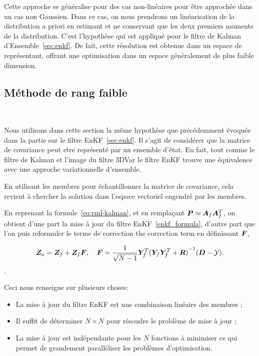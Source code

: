 Cette approche se généralise pour des cas non-linéaires pour être approchée dans un cas non Gaussien. Dans ce cas, on nous prendrons un linéarisation de la distribution a priori en estimant et ne conservant que les deux premiers moments de la distribution. C'est l'hypothèse qui est appliqué pour le filtre de Kalman d'Ensemble~\ref{sec:enkf}. De fait, cette résolution est obtenue dans un espace de représentant, offrant une optimisation dans un espace généralement de plus faible dimension.

\subsection{Méthode de rang faible}~\label{sec:faible_rang}

Nous utilisons dans cette section la même hypothèse que précédemment évoquée dans la partie sur le filtre EnKF~\ref{sec:enkf}. Il s'agit de considérer que la matrice de covariance peut etre représenté par un ensemble d'état. En fait, tout comme le filtre de Kalman et l'image du filtre 3DVar le filtre EnKF trouve une équivalence avec une approche variationnelle d'ensemble.

En utilisant les membres pour échantillonner la matrice de covariance, cela revient à chercher la solution dans l'espace vectoriel engendré par les membres.

En reprenant la formule~\ref{eq:rml-kalman}, et en remplaçant $\bm P \approx \bm A_f \bm A_f^T$, on obtient d'une part la mise à jour du filtre EnKF~\ref{enkf_formula}, d'autre part que l'on puis reformuler le terme de correction the correction term en définissant $\bm{F}$,

\begin{equation}
    \bm{Z}_a = \bm{Z}_f + \bm{Z}_f \bm{F}, \quad \bm{F} = \frac{1}{\sqrt{N-1}} \bm Y_f^T {(\bm Y_f \bm Y_f^T + \bm R)}^{-1}(\bm{D} - \mathcal{Y}).
\end{equation}.

Ceci nous renseigne sur plusieurs choses:
\begin{itemize}
    \item La mise à jour du filtre EnKF est une combinaison linéaire des membres ;
    \item Il suffit de déterminer $N \times N$ pour résoudre le problème de mise à jour ;
    \item La mise à jour est indépendante pour les $N$ fonctions à minimiser ce qui permet de grandement paralléliser les problèmes d'optimisation.
\end{itemize}

